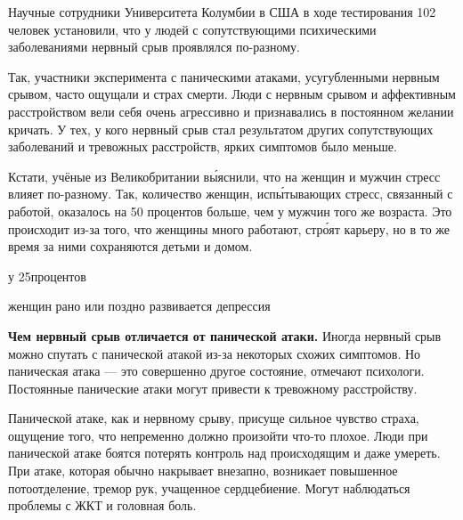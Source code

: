 Научные сотрудники Университета Колумбии в США в ходе тестирования 102 человек установили, что у людей с сопутствующими психическими заболеваниями нервный срыв проявлялся по-разному.

Так, участники эксперимента с паническими атаками, усугубленными нервным срывом, часто ощущали  и страх смерти. Люди с нервным срывом и аффективным расстройством вели себя очень агрессивно и признавались в постоянном желании кричать. У тех, у кого нервный срыв стал результатом других сопутствующих заболеваний и тревожных расстройств, ярких симптомов было меньше.

Кстати, учёные из Великобритании в\'{ы}яснили, что на женщин и мужчин стресс влияет по-разному. Так, количество женщин, исп\'{ы}тывающих стресс, связанный с работой, оказалось на 50 процентов больше, чем у мужчин того же возраста. Это происходит из-за того, что женщины много работают, стр\'{о}ят карьеру, но в то же время за ними сохраняются   детьми и домом.

\begin{framed}
    \begin{center}
        {
            \Huge
            у 25процентов
        }

        {
            \Large
            женщин рано или поздно развивается депрессия
        }
    \end{center}
\end{framed}

\textbf{Чем нервный срыв отличается от панической атаки.}
Иногда нервный срыв можно спутать с панической атакой из-за некоторых схожих симптомов. Но паническая атака  ---  это совершенно другое состояние, отмечают психологи. Постоянные панические атаки могут привести к тревожному расстройству.

Панической атаке, как и нервному срыву, присуще сильное чувство страха, ощущение того, что непременно должно произойти что-то плохое. Люди при панической атаке боятся потерять контроль над происходящим и даже умереть. При атаке, которая обычно накрывает внезапно, возникает повышенное потоотделение, тремор рук, учащенное сердцебиение. Могут наблюдаться проблемы с ЖКТ и головная боль.

